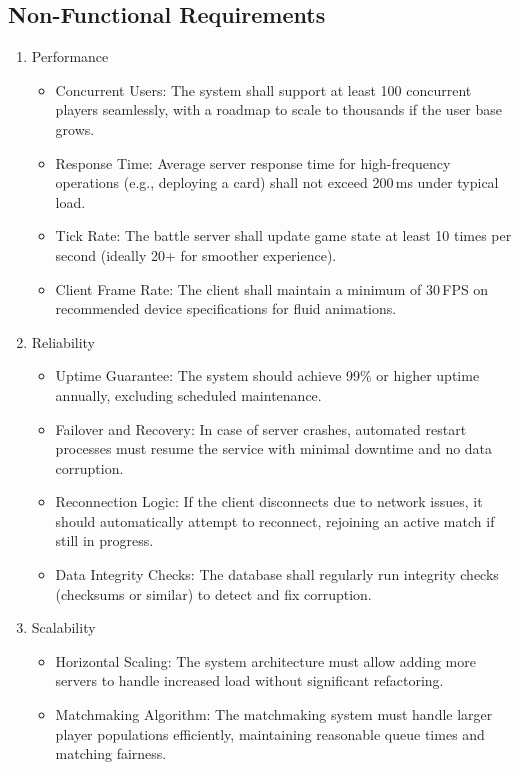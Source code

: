 \documentclass{article}
\begin{document}
\subsection{Non-Functional Requirements}
\begin{enumerate}[label=\textbf{NFR\arabic*:}]
    \item Performance
    \begin{itemize}
        \item Concurrent Users: The system shall support at least 100 concurrent players seamlessly, with a roadmap to scale to thousands if the user base grows.
        \item Response Time: Average server response time for high-frequency operations (e.g., deploying a card) shall not exceed 200\,ms under typical load.
        \item Tick Rate: The battle server shall update game state at least 10 times per second (ideally 20+ for smoother experience).
        \item Client Frame Rate: The client shall maintain a minimum of 30\,FPS on recommended device specifications for fluid animations.
    \end{itemize}
    \item Reliability
    \begin{itemize}
        \item Uptime Guarantee: The system should achieve 99\% or higher uptime annually, excluding scheduled maintenance.
        \item Failover and Recovery: In case of server crashes, automated restart processes must resume the service with minimal downtime and no data corruption.
        \item Reconnection Logic: If the client disconnects due to network issues, it should automatically attempt to reconnect, rejoining an active match if still in progress.
        \item Data Integrity Checks: The database shall regularly run integrity checks (checksums or similar) to detect and fix corruption.
    \end{itemize}
    \item Scalability
    \begin{itemize}
        \item Horizontal Scaling: The system architecture must allow adding more servers to handle increased load without significant refactoring.
        \item Matchmaking Algorithm: The matchmaking system must handle larger player populations efficiently, maintaining reasonable queue times and matching fairness.

\end{itemize}
\end{enumerate}
\end{document}
